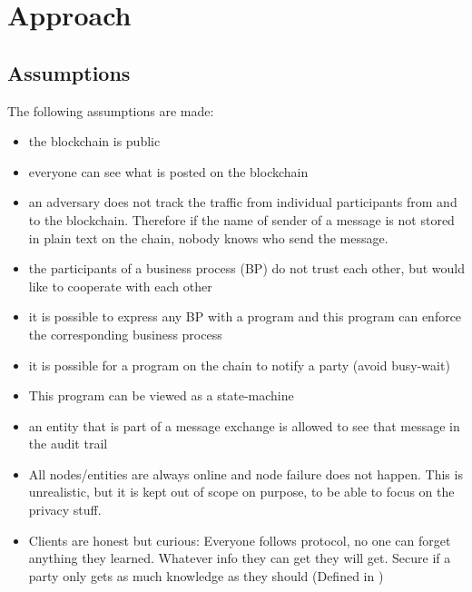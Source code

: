 \documentclass[runningheads]{llncs}
\begin{document}
\section{Approach}
\subsection{Assumptions}
The following assumptions are made: 
\begin{itemize}
    \item the blockchain is public
    \item everyone can see what is posted on the blockchain
    \item an adversary does not track the traffic from individual participants from and to the blockchain. Therefore if the name of sender of a message is not stored in plain text on the chain, nobody knows who send the message.
    \item the participants of a business process (BP) do not trust each other, but would like to cooperate with each other
    \item it is possible to express any BP with a program and this program can enforce the corresponding business process
    \item it is possible for a program on the chain to notify a party (avoid busy-wait) 
    \item This program can be viewed as a state-machine
     \item an entity that is part of a message exchange is allowed to see that message in the audit trail
     \item All nodes/entities are always online and node failure does not happen. This is unrealistic, but it is kept out of scope on purpose, to be able to focus on the privacy stuff.
     \item Clients are honest but curious: Everyone follows protocol, no one can forget anything they learned. Whatever info they can get they will get. Secure if a party only gets as much knowledge as they should (Defined in \cite{xiong2011cloudseal} \cite{paverd2014modelling})
\end{itemize}
\end{document}
